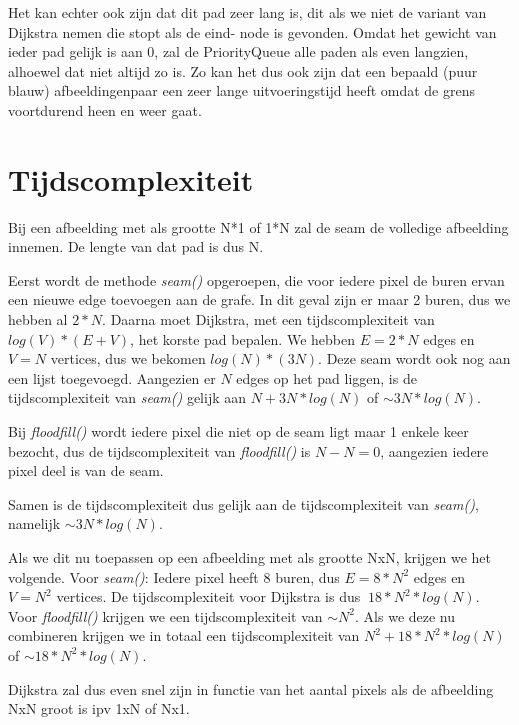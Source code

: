 \documentclass{article}
\begin{document}
Het kan echter ook zijn dat dit pad zeer lang is, dit als we niet de variant van Dijkstra nemen die stopt als de eind- node is gevonden. Omdat het gewicht van ieder pad gelijk
is aan 0, zal de PriorityQueue alle paden als \textquotedbl even lang\textquotedbl  zien, alhoewel dat niet altijd zo is. Zo kan het dus ook zijn dat een bepaald
(puur blauw) afbeeldingenpaar een zeer lange uitvoeringstijd heeft omdat de grens voortdurend heen en weer gaat.

\section{Tijdscomplexiteit}
Bij een afbeelding met als grootte N*1 of 1*N zal de seam de volledige afbeelding innemen. De lengte van dat pad is dus N.

Eerst wordt de methode \textit{seam()} opgeroepen, die voor iedere pixel de buren ervan een nieuwe edge toevoegen aan de grafe.
In dit geval zijn er maar 2 buren, dus we hebben al $2*N$. Daarna moet Dijkstra, met een tijdscomplexiteit van $ log (V) * (E + V) $, het korste pad bepalen.
We hebben $E=2*N$ edges en $V=N$ vertices, dus we bekomen $log(N)*(3N)$. Deze seam wordt ook nog aan een lijst toegevoegd. Aangezien er $N$ edges op het pad liggen, is de tijdscomplexiteit van \textit{seam()} gelijk aan $N+3N*log(N)$ of $\sim3N*log(N)$.

Bij \textit{floodfill()} wordt iedere pixel die niet op de seam ligt maar 1 enkele keer bezocht, dus de tijdscomplexiteit van \textit{floodfill()} is $N-N=0$, aangezien iedere pixel deel is van de seam.

Samen is de tijdscomplexiteit dus gelijk aan de tijdscomplexiteit van \textit{seam()}, \newline namelijk $\sim3N*log(N)$.

Als we dit nu toepassen op een afbeelding met als grootte NxN, krijgen we het volgende. \newline
Voor \textit{seam()}: Iedere pixel heeft 8 buren, dus $E=8*N^2$ edges en $V=N^2$ vertices. De tijdscomplexiteit voor Dijkstra is dus $~18*N^2 *log(N)$.\newline
Voor \textit{floodfill()} krijgen we een tijdscomplexiteit van $\sim N^2$. \newline
Als we deze nu combineren krijgen we in totaal een tijdscomplexiteit van $N^2 + 18*N^2 *log(N)$ of $\sim18*N^2*log(N)$.

Dijkstra zal dus even snel zijn in functie van het aantal pixels als de afbeelding NxN groot is ipv 1xN of Nx1.
\end{document}
